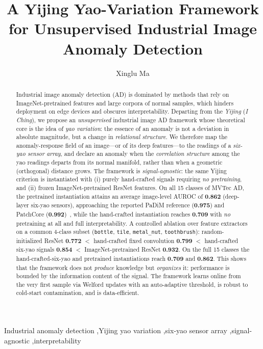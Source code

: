 \documentclass[preprint,12pt]{elsarticle}
\begin{document}
\begin{frontmatter}

\title{A Yijing Yao-Variation Framework for Unsupervised Industrial Image
Anomaly Detection}

\author[lq]{Xinglu Ma}

\address[lq]{School of Information Science and Technology, Qingdao University
of Science and Technology, Qingdao 266061, China}

\begin{abstract}
Industrial image anomaly detection (AD) is dominated by methods that
rely on ImageNet-pretrained features and large corpora of normal samples,
which hinders deployment on edge devices and obscures interpretability.
Departing from the \emph{Yijing} (\emph{I Ching}), we propose an \emph{unsupervised}
industrial image AD framework whose theoretical core is the idea of
\emph{yao variation}: the essence of an anomaly is not a deviation
in absolute magnitude, but a change in \emph{relational structure}. We
therefore map the anomaly-response field of an image---or of its deep
features---to the readings of a \emph{six-yao sensor array}, and declare an
anomaly when the \emph{correlation structure} among the yao readings
departs from its normal manifold, rather than when a geometric
(orthogonal) distance grows. The framework is \emph{signal-agnostic}: the
same Yijing criterion is instantiated with (i) purely hand-crafted signals
requiring \emph{no pretraining}, and (ii) frozen ImageNet-pretrained
ResNet features. On all 15 classes of MVTec AD, the pretrained
instantiation attains an average image-level AUROC of \textbf{0.862}
(deep-layer six-yao sensors), approaching the reported PaDiM reference
(\textbf{0.975}) and PatchCore (\textbf{0.992})~\cite{defard2021padim,roth2022patchcore},
while the hand-crafted instantiation reaches \textbf{0.709} with \emph{no}
pretraining at all and full interpretability.
A controlled ablation over feature extractors on a common 4-class subset
(\texttt{bottle}, \texttt{tile}, \texttt{metal\_nut}, \texttt{toothbrush}):
random-initialized ResNet \textbf{0.772} $<$ hand-crafted fixed convolution
\textbf{0.799} $<$ hand-crafted six-yao signals \textbf{0.854} $<$
ImageNet-pretrained ResNet \textbf{0.932}.
On the full 15 classes the hand-crafted-six-yao and pretrained
instantiations reach \textbf{0.709} and \textbf{0.862}. This shows that the framework does
not \emph{produce} knowledge but \emph{organizes} it: performance is bounded
by the information content of the signal. The framework learns online from
the very first sample via Welford updates with an auto-adaptive threshold,
is robust to cold-start contamination, and is data-efficient.
\end{abstract}

\begin{keyword}
Industrial anomaly detection \sep Yijing yao variation \sep six-yao sensor
array \sep signal-agnostic \sep interpretability
\end{keyword}

\end{frontmatter}
\end{document}
